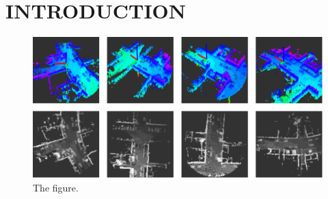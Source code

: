 \section{INTRODUCTION}
\label{sec:introduction}
\begin{figure}
	\centering
	\includegraphics[width=0.9\linewidth]{figures/obm.pdf}
	\caption{The figure.}
	\label{fig:obm}
\end{figure}

